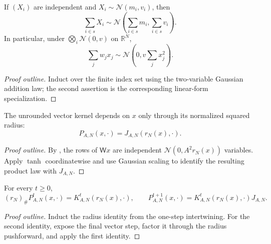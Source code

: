 \begin{lemma}
  \label{lem:gaussian-sum}
  \leanok
  If $(X_i)$ are independent and $X_i\sim\mathcal N(m_i,v_i)$, then
  \[
    \sum_{i\in s}X_i
      \sim\mathcal N\!\left(\sum_{i\in s}m_i,\sum_{i\in s}v_i\right).
  \]
  In particular, under $\bigotimes_i\mathcal N(0,v)$ on $\mathbb R^N$,
  \[
    \sum_j w_jx_j\sim\mathcal N\!\left(0,v\sum_jx_j^2\right).
  \]
\end{lemma}
\begin{proof}[Proof outline]
  \leanok
  Induct over the finite index set using the two-variable Gaussian addition
  law; the second assertion is the corresponding linear-form specialization.
\end{proof}

\begin{lemma}
  \label{lem:gaussian-isotropy}
  \leanok
  The unrounded vector kernel depends on $x$ only through its normalized
  squared radius:
  \[
    P_{A,N}(x,\cdot)=J_{A,N}(r_N(x),\cdot).
  \]
\end{lemma}
\begin{proof}[Proof outline]
  \leanok
  By , the rows of $\mathsf Wx$ are independent
  $\mathcal N(0,A^2r_N(x))$ variables. Apply $\tanh$ coordinatewise and use
  Gaussian scaling to identify the resulting product law with $J_{A,N}$.
\end{proof}

\begin{lemma}
  \label{lem:gaussian-vector-radius-laws}
  \leanok
  For every $t\geq0$,
  \[
    (r_N)_\#P_{A,N}^t(x,\cdot)=K_{A,N}^t(r_N(x),\cdot),
    \qquad
    P_{A,N}^{t+1}(x,\cdot)=K_{A,N}^{t}(r_N(x),\cdot)J_{A,N}.
  \]
\end{lemma}
\begin{proof}[Proof outline]
  \leanok
  Induct the radius identity from the one-step intertwining. For the second
  identity, expose the final vector step, factor it through the radius
  pushforward, and apply the first identity.
\end{proof}

